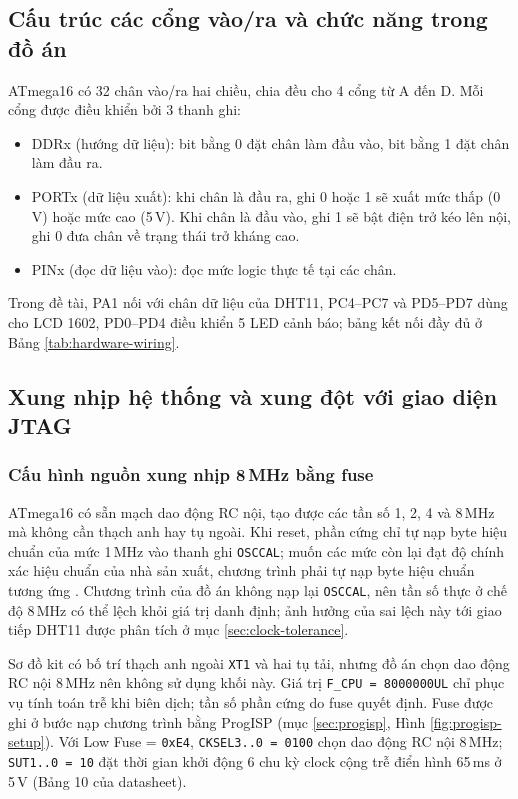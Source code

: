 \subsection{Cấu trúc các cổng vào/ra và chức năng trong đồ án}

ATmega16 có 32 chân vào/ra hai chiều, chia đều cho 4 cổng từ A đến D. Mỗi cổng được điều khiển bởi 3 thanh ghi:
\begin{itemize}[leftmargin=1.2cm]
    \item DDRx (hướng dữ liệu): bit bằng 0 đặt chân làm đầu vào, bit bằng 1 đặt chân làm đầu ra.
    \item PORTx (dữ liệu xuất): khi chân là đầu ra, ghi 0 hoặc 1 sẽ xuất mức thấp (0\,V) hoặc mức cao (5\,V). Khi chân là đầu vào, ghi 1 sẽ bật điện trở kéo lên nội, ghi 0 đưa chân về trạng thái trở kháng cao.
    \item PINx (đọc dữ liệu vào): đọc mức logic thực tế tại các chân.
\end{itemize}

Trong đề tài, PA1 nối với chân dữ liệu của DHT11, PC4--PC7 và PD5--PD7 dùng cho LCD 1602, PD0--PD4 điều khiển 5 LED cảnh báo; bảng kết nối đầy đủ ở Bảng \ref{tab:hardware-wiring}.

\subsection{Xung nhịp hệ thống và xung đột với giao diện JTAG}

\subsubsection{Cấu hình nguồn xung nhịp 8\,MHz bằng fuse}
\label{sec:clock}
ATmega16 có sẵn mạch dao động RC nội, tạo được các tần số 1, 2, 4 và 8\,MHz mà không cần thạch anh hay tụ ngoài. Khi reset, phần cứng chỉ tự nạp byte hiệu chuẩn của mức 1\,MHz vào thanh ghi \texttt{OSCCAL}; muốn các mức còn lại đạt độ chính xác hiệu chuẩn của nhà sản xuất, chương trình phải tự nạp byte hiệu chuẩn tương ứng \cite{atmega16-datasheet}. Chương trình của đồ án không nạp lại \texttt{OSCCAL}, nên tần số thực ở chế độ 8\,MHz có thể lệch khỏi giá trị danh định; ảnh hưởng của sai lệch này tới giao tiếp DHT11 được phân tích ở mục \ref{sec:clock-tolerance}.

Sơ đồ kit có bố trí thạch anh ngoài \texttt{XT1} và hai tụ tải, nhưng đồ án chọn dao động RC nội 8\,MHz nên không sử dụng khối này. Giá trị \texttt{F\_CPU = 8000000UL} chỉ phục vụ tính toán trễ khi biên dịch; tần số phần cứng do fuse quyết định. Fuse được ghi ở bước nạp chương trình bằng ProgISP (mục \ref{sec:progisp}, Hình \ref{fig:progisp-setup}). Với Low Fuse = \texttt{0xE4}, \texttt{CKSEL3..0 = 0100} chọn dao động RC nội 8\,MHz; \texttt{SUT1..0 = 10} đặt thời gian khởi động 6 chu kỳ clock cộng trễ điển hình 65\,ms ở 5\,V (Bảng 10 của datasheet).

